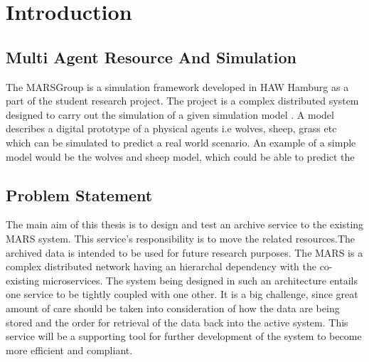 \newpage
\chapter{Introduction}
    \section{Multi Agent Resource And Simulation}
        
        The MARS\footnotemark Group is a simulation framework developed 
        in HAW Hamburg as a  part of the student research project. The project is a complex 
        distributed system designed to carry out the simulation of a given simulation model 
        \cite{HAWHamburgMARS}. 
        A model describes a digital prototype of a physical agents i.e wolves, sheep, grass etc 
        which can be simulated to predict a real world scenario. An example of a simple model would
        be the wolves and sheep model, which could be able to predict the 

    \section{Problem Statement}

        The main aim of this thesis is to design and test an archive service
        to the existing MARS system. This service's responsibility is to move the related resources.The archived data is intended 
        to be used for future research purposes.
        The MARS is a complex distributed network having an
        hierarchal dependency with the co-existing microservices. The system being designed
        in such an architecture entails one service to be tightly coupled with one other. It is 
        a big challenge, since great amount of care should be taken into consideration of how the 
        data are being stored and the order for retrieval of the data back into the active system.
        This service will be a supporting tool for further development of the system to become more 
        efficient and compliant. 
    
